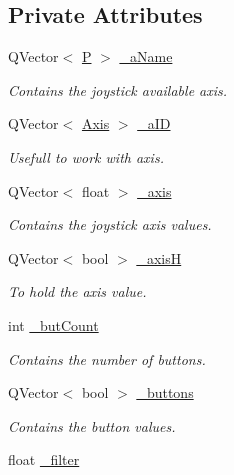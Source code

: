 \subsection*{Private Attributes}
\begin{DoxyCompactItemize}
\item 
Q\+Vector$<$ \hyperlink{class_x_joystick_acad1887250d6f70a997cd7b1e5bbba8a}{P} $>$ \hyperlink{class_x_joystick_a9691db53f781029df614e6e7268f6600}{\+\_\+a\+Name}
\begin{DoxyCompactList}\small\item\em Contains the joystick available axis. \end{DoxyCompactList}\item 
Q\+Vector$<$ \hyperlink{struct_x_joystick_1_1_axis}{Axis} $>$ \hyperlink{class_x_joystick_ac1bab2d7ac8c682fab73f855653bfe24}{\+\_\+a\+I\+D}
\begin{DoxyCompactList}\small\item\em Usefull to work with axis. \end{DoxyCompactList}\item 
Q\+Vector$<$ float $>$ \hyperlink{class_x_joystick_aa81258bbab92ce6946d0f25e6da521a7}{\+\_\+axis}
\begin{DoxyCompactList}\small\item\em Contains the joystick axis values. \end{DoxyCompactList}\item 
Q\+Vector$<$ bool $>$ \hyperlink{class_x_joystick_a98105f2ba9654c2d1fd42b58fb689533}{\+\_\+axis\+H}
\begin{DoxyCompactList}\small\item\em To hold the axis value. \end{DoxyCompactList}\item 
int \hyperlink{class_x_joystick_abaa9a13b0d15f4d457cb1a0cb8d1c257}{\+\_\+but\+Count}
\begin{DoxyCompactList}\small\item\em Contains the number of buttons. \end{DoxyCompactList}\item 
Q\+Vector$<$ bool $>$ \hyperlink{class_x_joystick_a2067117adaa8161d974e6c2bb9776ec3}{\+\_\+buttons}
\begin{DoxyCompactList}\small\item\em Contains the button values. \end{DoxyCompactList}\item 
float \hyperlink{class_x_joystick_ab209883db3b333014323cba17123bb9b}{\+\_\+filter}

\end{DoxyCompactItemize}
